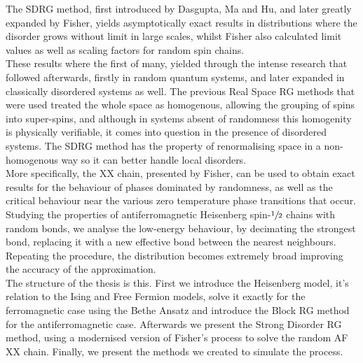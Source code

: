 \documentclass[../main.tex]{subfiles}
\begin{document}
The SDRG method, first introduced by Dasgupta, Ma and Hu, and later greatly expanded by Fisher, yields asymptotically exact results in distributions where the disorder grows without limit in large scales, whilst Fisher also calculated limit values as well as scaling factors for random spin chains.\\

These results where the first of many, yielded through the intense research that followed afterwards, firstly in random quantum systems, and later expanded in classically disordered systems as well. The previous Real Space RG methods that were used treated the whole space as homogenous, allowing the grouping of spins into super-spins, and although in systems absent of randomness this homogenity is physically verifiable, it comes into question in the presence of disordered systems. The SDRG method has the property of renormalising space in a non-homogenous way so it can better handle local disorders.\\
 
More specifically, the XX chain, presented by Fisher, can be used to obtain exact results for the behaviour of phases dominated by randomness, as well as the critical behaviour near the various zero temperature phase transitions that occur. Studying the properties of antiferromagnetic Heisenberg spin-$\sfrac{1}{2}$ chains with random bonds, we analyse the low-energy behaviour, by decimating the strongest bond, replacing it with a new effective bond between the nearest neighbours. Repeating the procedure, the distribution becomes extremely broad improving the accuracy of the approximation. \\

The structure of the thesis is this. First we introduce the Heisenberg model, it's relation to the Ising and Free Fermion models, solve it exactly for the ferromagnetic case using the Bethe Ansatz and introduce the Block RG method for the antiferromagnetic case. Afterwards we present the Strong Disorder RG method, using a modernised version of Fisher's process to solve the random AF XX chain. Finally, we present the methods we created to simulate the process.
\end{document}
